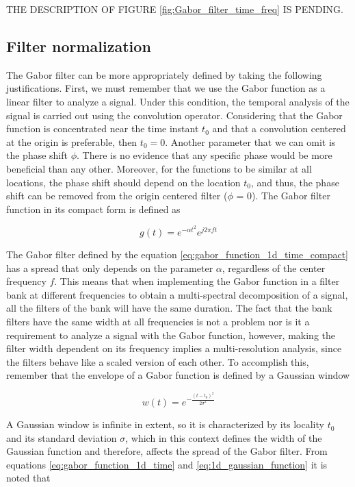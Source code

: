 THE DESCRIPTION OF FIGURE \ref{fig:Gabor_filter_time_freq} IS PENDING.

\subsection{Filter normalization}

The Gabor filter can be more appropriately defined by taking the following justifications. First, we must remember that we use the Gabor function as a linear filter to analyze a signal. Under this condition, the temporal analysis of the signal is carried out using the convolution operator. Considering that the Gabor function is concentrated near the time instant $t_0$ and that a convolution centered at the origin is preferable, then $t_0 = 0$. Another parameter that we can omit is the phase shift $\phi$. There is no evidence that any specific phase would be more beneficial than any other. Moreover, for the functions to be similar at all locations, the phase shift should depend on the location $t_0$, and thus, the phase shift can be removed from the origin centered filter ($\phi$ = 0). The Gabor filter function in its compact form is defined as 

\begin{equation}\label{eq:gabor_function_1d_time_compact}
    g(t) =  e ^{-\alpha t^2} e ^{j 2 \pi f t }
\end{equation}

The Gabor filter defined by the equation \eqref{eq:gabor_function_1d_time_compact} has a spread that only depends on the parameter $\alpha$, regardless of the center frequency $f$. This means that when implementing the Gabor function in a filter bank at different frequencies to obtain a multi-spectral decomposition of a signal, all the filters of the bank will have the same duration. The fact that the bank filters have the same width at all frequencies is not a problem nor is it a requirement to analyze a signal with the Gabor function, however, making the filter width dependent on its frequency implies a multi-resolution analysis, since the filters behave like a scaled version of each other. To accomplish this, remember that the envelope of a Gabor function is defined by a Gaussian window 

\begin{equation}\label{eq:1d_gaussian_function}
    w(t)=e^{-\frac{(t-t_0)^2}{2\sigma^2}}
\end{equation}

A Gaussian window is infinite in extent, so it is characterized by its locality $t_0$ and its standard deviation $\sigma$, which in this context defines the width of the Gaussian function and therefore, affects the spread of the Gabor filter. From equations  \eqref{eq:gabor_function_1d_time} and \eqref{eq:1d_gaussian_function} it is noted that 

